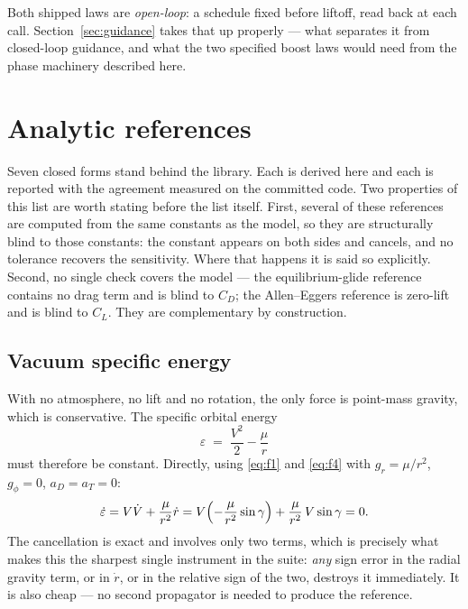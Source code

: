 \documentclass[11pt]{article}
\begin{document}
Both shipped laws are \emph{open-loop}: a schedule fixed before liftoff, read
back at each call. Section~\ref{sec:guidance} takes that up properly ---
what separates it from closed-loop guidance, and what the two specified boost
laws would need from the phase machinery described here.

\section{Analytic references}
\label{sec:analytic}

Seven closed forms stand behind the library. Each is derived here and each is
reported with the agreement measured on the committed code. Two properties of
this list are worth stating before the list itself. First, several of these
references are computed from the same constants as the model, so they are
structurally blind to those constants: the constant appears on both sides and
cancels, and no tolerance recovers the sensitivity. Where that happens it is
said so explicitly. Second, no single check covers the model --- the
equilibrium-glide reference contains no drag term and is blind to $C_D$; the
Allen--Eggers reference is zero-lift and is blind to $C_L$. They are
complementary by construction.

\subsection{Vacuum specific energy}
\label{sec:energy}

With no atmosphere, no lift and no rotation, the only force is point-mass
gravity, which is conservative. The specific orbital energy
\begin{equation}
  \varepsilon \;=\; \frac{V^2}{2} - \frac{\mu}{r}
  \label{eq:energy}
\end{equation}
must therefore be constant. Directly, using \eqref{eq:f1} and \eqref{eq:f4}
with $g_r=\mu/r^2$, $g_\phi=0$, $a_D = a_T = 0$:
\begin{equation}
  \dot\varepsilon = V\dot V + \frac{\mu}{r^2}\dot r
  = V\Bigl(-\frac{\mu}{r^2}\sin\gamma\Bigr) + \frac{\mu}{r^2}\,V\sin\gamma
  = 0 .
\end{equation}
The cancellation is exact and involves only two terms, which is precisely what
makes this the sharpest single instrument in the suite: \emph{any} sign error
in the radial gravity term, or in $\dot r$, or in the relative sign of the two,
destroys it immediately. It is also cheap --- no second propagator is needed to
produce the reference.
\end{document}
